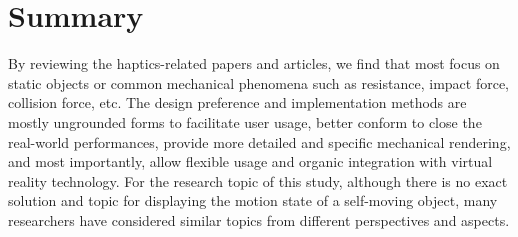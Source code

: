 \section{Summary}
By reviewing the haptics-related papers and articles, we find that most focus on static objects or common mechanical phenomena such as resistance, impact force, collision force, etc. The design preference and implementation methods are mostly ungrounded forms to facilitate user usage, better conform to close the real-world performances, provide more detailed and specific mechanical rendering, and most importantly, allow flexible usage and organic integration with virtual reality technology. For the research topic of this study, although there is no exact solution and topic for displaying the motion state of a self-moving object, many researchers have considered similar topics from different perspectives and aspects.
